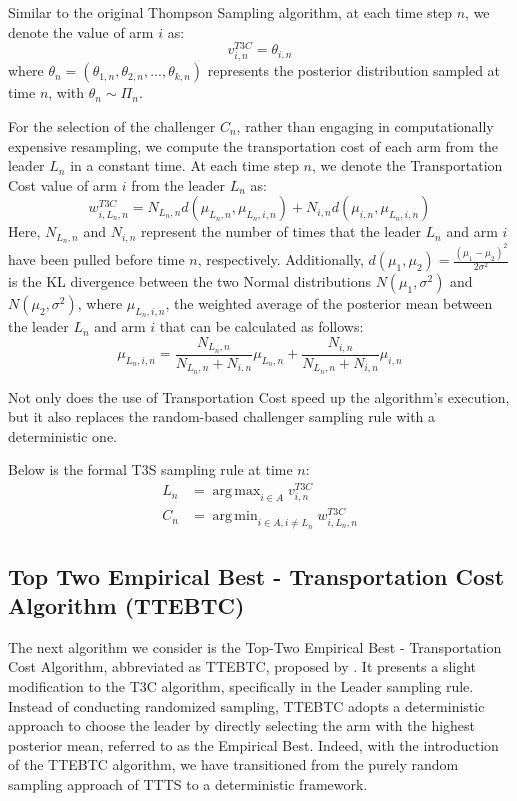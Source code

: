 \documentclass[a4paper, 12pt]{article}
\DeclareMathOperator{\argmax}{arg\,max}
\DeclareMathOperator{\argmin}{arg\,min}
\theoremstyle{definition}
\begin{document}
Similar to the original Thompson Sampling algorithm, at each time step $n$, we denote the value of arm $i$ as:
\[
v_{i,n}^{T3C} = \theta_{i,n}   
\]
where $\theta_n = (\theta_{1,n},\theta_{2,n}, ..., \theta_{k,n})$ represents the posterior distribution sampled at time $n$, with $\theta_{n}\sim \Pi_n$.

For the selection of the challenger $C_n$, rather than engaging in computationally expensive resampling, we compute the transportation cost of each arm from the leader $L_n$ in a constant time. At each time step $n$, we denote the Transportation Cost value of arm $i$ from the leader $L_n$ as:
\[
w_{i,L_n,n}^{T3C} = N_{L_n,n} d(\mu_{L_n,n},\mu_{L_n,i,n})+ N_{i,n} d(\mu_{i,n},\mu_{L_n,i,n})     
\]
Here, $N_{L_n,n}$ and $N_{i,n}$ represent the number of times that the leader $L_n$ and arm $i$ have been pulled before time $n$, respectively. Additionally, $d(\mu_1,\mu_2) = \frac{(\mu_1 - \mu_2)^2}{2\sigma^2}$ is the KL divergence between the two Normal distributions $N(\mu_1,\sigma^2)$ and $N(\mu_2,\sigma^2)$, where $\mu_{L_n,i,n}$, the weighted average of the posterior mean between the leader $L_n$ and arm $i$ that can be calculated as follows:
\[
\mu_{L_n,i,n} = \frac{N_{L_n,n}}{N_{L_n,n}+N_{i,n}} \mu_{L_n,n} + \frac{N_{i,n}}{N_{L_n,n}+N_{i,n}} \mu_{i,n}  
\]

Not only does the use of Transportation Cost speed up the algorithm's execution, but it also replaces the random-based challenger sampling rule with a deterministic one.

Below is the formal T3S sampling rule at time $n$:
\begin{align} \label{eq:t3c}
L_n & = \argmax_{i\in A} v_{i,n}^{T3C} \nonumber \\
C_n & = \argmin_{i\in A,i\neq L_n} w_{i,L_n,n}^{T3C}
\end{align}


\subsection{Top Two Empirical Best - Transportation Cost Algorithm (TTEBTC)}
The next algorithm we consider is the Top-Two Empirical Best - Transportation Cost Algorithm, abbreviated as TTEBTC, proposed by \cite{ttebtc}. It presents a slight modification to the T3C algorithm, specifically in the Leader sampling rule. Instead of conducting randomized sampling, TTEBTC adopts a deterministic approach to choose the leader by directly selecting the arm with the highest posterior mean, referred to as the Empirical Best. Indeed, with the introduction of the TTEBTC algorithm, we have transitioned from the purely random sampling approach of TTTS to a deterministic framework.
\end{document}
